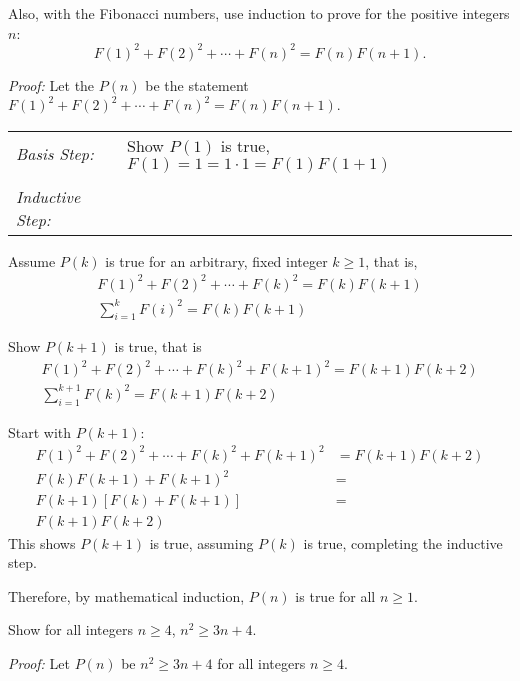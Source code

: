 \begin{questions}
  Also, with the Fibonacci numbers, use induction to prove for the positive integers $n$: 
\[ F(1)^2 + F(2)^2 + \cdots + F(n)^2 = F(n)F(n+1). \]
    \ifprintanswers
        \vspace{-10pt}
   \fi
\begin{solution}
  \textit{Proof:}
  Let the $P(n)$ be the statement $F(1)^2 + F(2)^2 + \cdots + F(n)^2 = F(n)F(n+1)$.

  \smallskip
  \begin{tabular}{lp{4in}}
    \textit{Basis Step:} & Show $P(1)$ is true, $F(1) = 1 = 1\cdot1 = F(1)F(1+1)$ \\
     & \\
   \textit{Inductive Step:} &  \\
  \end{tabular}

  Assume $P(k)$ is true for an arbitrary, fixed integer $k \geq 1$, that is,
  \begin{align*}
    F(1)^2 + F(2)^2 + \cdots + F(k)^2  = F(k)F(k+1)  \tag{IH} \\
    \sum_{i=1}^k F(i)^2 = F(k)F(k+1)
  \end{align*}

  Show $P(k+1)$ is true, that is
  \begin{align*}
    F(1)^2 + F(2)^2 + \cdots + F(k)^2 + F(k+1)^2 = F(k+1)F(k+2) \\
    \sum_{i=1}^{k+1} F(k)^2 = F(k+1)F(k+2) 
  \end{align*}

  Start with $P(k+1)$:
  \begin{align*}
    F(1)^2 + F(2)^2 + \cdots + F(k)^2 + F(k+1)^2 &= F(k+1)F(k+2) \\
    F(k)F(k+1) + F(k+1)^2 &= \tag{IH} \\
    F(k+1)\left[ F(k) + F(k+1) \right] &= \\
    F(k+1)F(k+2) 
  \end{align*}
  This shows $P(k+1)$ is true, assuming $P(k)$ is true, completing the inductive step. 

  Therefore, by mathematical induction, $P(n)$ is true for all $n \geq 1$.
\end{solution}


 Show for all integers $n \geq 4$, $n^2 \geq 3n + 4$. 
    \ifprintanswers
        \vspace{-10pt}
   \fi
\begin{solution}
  \textit{Proof:}
  Let $P(n)$ be $n^2 \geq 3n + 4$ for all integers $n \geq 4$.


\end{solution}
\end{questions}
